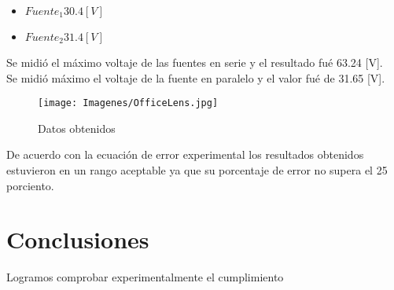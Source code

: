 \documentclass{article}
\begin{document}
\begin{itemize}
    \item $Fuente_1 30.4 [V]$ 
    \item $Fuente_2 31.4 [V]$
\end{itemize}

Se midió el máximo voltaje de las fuentes en serie y el resultado fué 63.24 [V].\\

Se midió máximo el voltaje de la fuente en paralelo y el valor fué de 31.65 [V].\\

\begin{figure}[h!]
    \centering
    \texttt{[image: Imagenes/OfficeLens.jpg]}
    \caption{Datos obtenidos}
    \label{fig:hojaFirmada}
\end{figure}

De acuerdo con la ecuación de error experimental los resultados obtenidos estuvieron en un rango aceptable ya que su porcentaje de error no supera el 25 porciento.\\

\section{Conclusiones}
Logramos comprobar experimentalmente el cumplimiento




\end{document}
